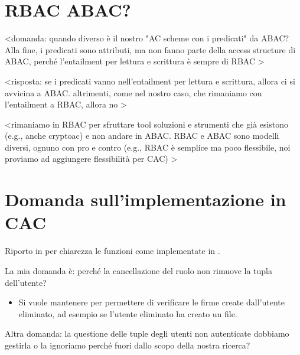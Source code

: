 \section{RBAC \textrightarrow  ABAC?}
\label{note:abac}

\textless domanda: quando diverso è il nostro "AC scheme con i predicati" da ABAC? Alla fine, i predicati sono attributi, ma non fanno parte della access structure di ABAC, perché l'entailment per lettura e scrittura è sempre di RBAC \textgreater

\textless risposta: se i predicati vanno nell'entailment per lettura e scrittura, allora ci si avvicina a ABAC. altrimenti, come nel nostro caso, che rimaniamo con l'entailment a RBAC, allora no \textgreater

\textless rimaniamo in RBAC per sfruttare tool soluzioni e strumenti che già esistono (e.g., anche cryptoac) e non andare in ABAC. RBAC e ABAC sono modelli diversi, ognuno con pro e contro (e.g., RBAC è semplice ma poco flessibile, noi proviamo ad aggiungere flessibilità per CAC) \textgreater

\section{Domanda sull'implementazione in CAC}
\label{sec:todos.questioncac}

Riporto in  per chiarezza le funzioni come implementate in \cite{cac}.

La mia domanda è: perché la cancellazione del ruolo non rimuove la tupla dell'utente? 
\begin{itemize}
    \item Si vuole mantenere per permettere di verificare le firme create dall'utente eliminato, ad esempio se l'utente eliminato ha creato un file.
\end{itemize}

Altra domanda: la questione delle tuple degli utenti non autenticate dobbiamo gestirla o la ignoriamo perché fuori dallo scopo della nostra ricerca?

